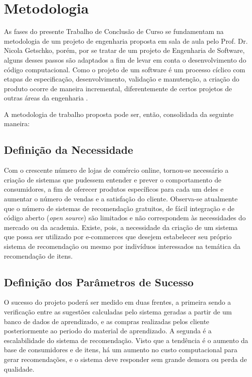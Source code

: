 \chapter[Metodologia]{Metodologia}
\label{chap:metodologia}

As fases do presente Trabalho de Conclusão de Curso se fundamentam na metodologia de um projeto de engenharia proposta em sala de aula pelo Prof. Dr. Nicola Getschko, porém, por se tratar de um projeto de Engenharia de Software, alguns desses passos são adaptados a fim de levar em conta o desenvolvimento do código computacional. Como o projeto de um software é um processo cíclico com etapas de especificação, desenvolvimento, validação e manutenção, a criação do produto ocorre de maneira incremental, diferentemente de certos projetos de outras áreas da engenharia \cite{iterative-development}. 

A metodologia de trabalho proposta pode ser, então, consolidada da seguinte maneira: 

\section{Definição da Necessidade} %
\label{sec:defini_o_da_necessidade}


Com o crescente número de lojas de comércio online, tornou-se necessário a criação de sistemas que pudessem entender e prever o comportamento de consumidores, a fim de oferecer produtos específicos para cada um deles e aumentar o número de vendas e a satisfação do cliente. Observa-se atualmente que o número de sistemas de recomendação gratuitos, de fácil integração e de código aberto (\textit{open source}) são limitados e não correspondem às necessidades do mercado ou da academia. Existe, pois, a necessidade da criação de um sistema que possa ser utilizado por e-commerces que desejem estabelecer seu próprio sistema de recomendação ou mesmo por indivíduos interessados na temática da recomendação de itens.

\section{Definição dos Parâmetros de Sucesso} %
\label{sec:defini_o_dos_par_metros_de_sucesso}


O sucesso do projeto poderá ser medido em duas frentes, a primeira sendo a verificação entre as sugestões calculadas pelo sistema geradas a partir de um banco de dados de aprendizado, e as compras realizadas pelos cliente posteriormente ao  periodo do material de aprendizado. A segunda é a escalabilidade do sistema de recomendação. Visto que a tendência é o aumento da base de consumidores e de itens, há um aumento no custo computacional para gerar recomendações, e o sistema deve responder sem grande demora ou perda de qualidade.

